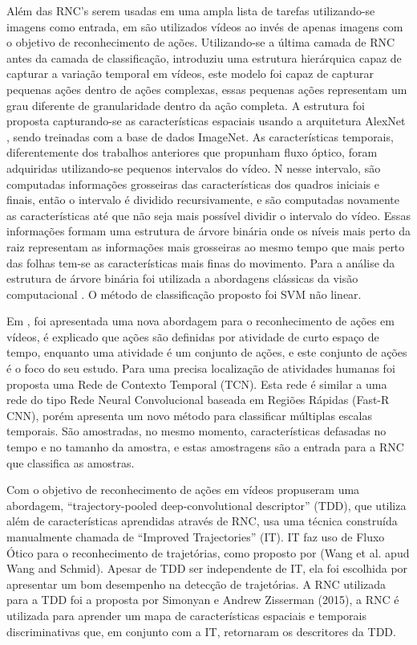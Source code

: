 \documentclass[
	12pt,				%
    oneside,			%
	a4paper,			%
	english,			%
	french,				%
	spanish,			%
	brazil,				%
	]{abntex2}
\begin{document}
Além das RNC’s serem usadas em uma ampla lista de tarefas utilizando-se imagens como entrada, em   são utilizados vídeos ao invés de apenas imagens com o objetivo de reconhecimento de ações. Utilizando-se a última camada de RNC antes da camada de classificação,  introduziu uma estrutura hierárquica capaz de capturar a variação temporal em vídeos, este modelo foi capaz de capturar pequenas ações dentro de ações complexas, essas pequenas ações representam um grau diferente de granularidade dentro da ação completa. A estrutura foi proposta capturando-se as características espaciais usando a arquitetura AlexNet , sendo treinadas com a base de dados ImageNet. As características temporais, diferentemente dos trabalhos anteriores que propunham fluxo óptico, foram adquiridas utilizando-se pequenos intervalos do vídeo. N nesse intervalo, são computadas informações grosseiras das características dos quadros iniciais e finais, então o intervalo é dividido recursivamente, e são computadas novamente as características até que não seja mais possível dividir o intervalo do vídeo. Essas informações formam uma estrutura de árvore binária onde os níveis mais perto da raiz representam as informações mais grosseiras ao mesmo tempo que mais perto das folhas tem-se as características mais finas do movimento. Para a análise da estrutura de árvore binária foi utilizada a abordagens clássicas da visão computacional . O método de classificação proposto foi SVM não linear.

Em , foi apresentada uma nova abordagem para o reconhecimento de ações em vídeos, é explicado que ações são definidas por atividade de curto espaço de tempo, enquanto uma atividade é um conjunto de ações, e este conjunto de ações é o foco do seu estudo. Para uma precisa localização de atividades humanas foi proposta uma Rede de Contexto Temporal (TCN). Esta rede é similar a uma rede do tipo Rede Neural Convolucional baseada em Regiões Rápidas (Fast-R CNN), porém apresenta um novo método para classificar múltiplas escalas temporais. São amostradas, no mesmo momento, características defasadas no tempo e no tamanho da amostra, e estas amostragens são a entrada para a RNC que classifica as amostras.

Com o objetivo de reconhecimento de ações em vídeos  propuseram uma abordagem, “trajectory-pooled deep-convolutional descriptor” (TDD), que utiliza além de características aprendidas através de RNC, usa uma técnica construída manualmente chamada de “Improved Trajectories” (IT). IT faz uso de Fluxo Ótico para o reconhecimento de trajetórias, como proposto por (Wang et al. apud Wang and Schmid). Apesar de TDD ser independente de IT, ela foi escolhida por apresentar um bom desempenho na detecção de trajetórias. A RNC utilizada para a TDD foi a proposta por Simonyan e Andrew Zisserman (2015), a RNC é utilizada para aprender um mapa de características espaciais e temporais discriminativas que, em conjunto com a IT, retornaram os descritores da TDD.
\end{document}
